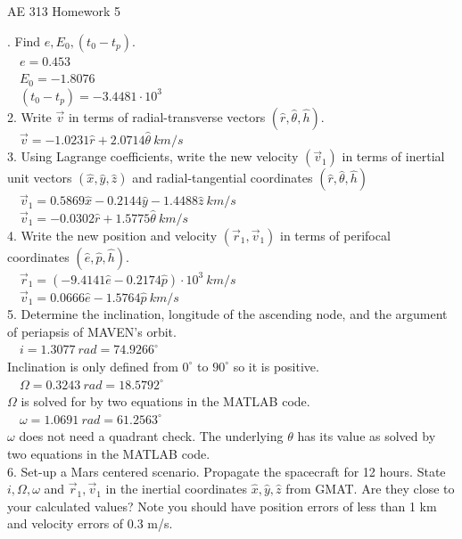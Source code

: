 \documentclass[hidelinks,12pt]{article}
\begin{document}

\begin{center}
\large AE 313 Homework 5
\end{center}
. Find $e, E_0, (t_0-t_p).$\\
  ~~$e = 0.453$\\
  ~~$E_0 = -1.8076$\\
  ~~$(t_0-t_p) = -3.4481 \cdot 10^3$\\
\vspace{5px}
2. Write $\vec{v}$ in terms of radial-transverse vectors $(\hat{r}, \hat{\theta}, \hat{h}).$\\
  ~~$\vec{v} = -1.0231 \hat{r} + 2.0714 \hat{\theta}~km/s$\\
\vspace{5px}
3. Using Lagrange coefficients, write the new velocity $(\vec{v}_1)$ in terms of inertial unit vectors $(\hat{x}, \hat{y}, \hat{z})$ and radial-tangential coordinates $(\hat{r}, \hat{\theta}, \hat{h})$\\
  ~~$\vec{v}_1 = 0.5869 \hat{x} - 0.2144 \hat{y} - 1.4488 \hat{z}~km/s$\\
  ~~$\vec{v}_1 = -0.0302 \hat{r} + 1.5775 \hat{\theta}~km/s$\\
\vspace{5px}
4. Write the new position and velocity $(\vec{r}_1, \vec{v}_1)$ in terms of perifocal coordinates $(\hat{e}, \hat{p}, \hat{h})$.\\
  ~~$\vec{r}_1 = (-9.4141 \hat{e} - 0.2174 \hat{p}) \cdot 10^3~km/s$\\
  ~~$\vec{v}_1 = 0.0666 \hat{e} - 1.5764 \hat{p}~km/s$\\
\vspace{5px}
5. Determine the inclination, longitude of the ascending node, and the argument of periapsis of MAVEN's orbit.\\
~~$i = 1.3077~rad = 74.9266^\circ$\\
Inclination is only defined from $0^\circ$ to $90^\circ$ so it is positive.\\
~~$\Omega = 0.3243~rad = 18.5792^\circ$\\
$\Omega$ is solved for by two equations in the MATLAB code.\\
~~$\omega = 1.0691~rad = 61.2563^\circ$\\
$\omega$ does not need a quadrant check. The underlying $\theta$ has its value as solved by two equations in the MATLAB code.\\
\vspace{5px}
6. Set-up a Mars centered scenario. Propagate the spacecraft for 12 hours. State $i, \Omega, \omega$ and $\vec{r}_1, \vec{v}_1$ in the inertial coordinates $\hat{x}, \hat{y}, \hat{z}$ from GMAT. Are they close to your calculated values? Note you should have position errors of less than 1 km and velocity errors of 0.3 m/s.\\
\end{document}
